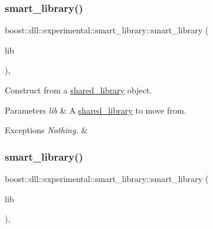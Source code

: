 \subsubsection{\texorpdfstring{smart\+\_\+library()}{smart\_library()}\hspace{0.1cm}{\footnotesize\ttfamily [7/8]}}
{\footnotesize\ttfamily boost\+::dll\+::experimental\+::smart\+\_\+library\+::smart\+\_\+library (\begin{DoxyParamCaption}\item[{const \hyperlink{a01708}{shared\+\_\+library} \&}]{lib }\end{DoxyParamCaption})\hspace{0.3cm}{\ttfamily [inline]}, {\ttfamily [explicit]}}

Construct from a \hyperlink{a01708}{shared\+\_\+library} object.


\begin{DoxyParams}{Parameters}
{\em lib} & A \hyperlink{a01708}{shared\+\_\+library} to move from.\\
\hline
\end{DoxyParams}

\begin{DoxyExceptions}{Exceptions}
{\em Nothing.} & \\
\hline
\end{DoxyExceptions}
\mbox{\label{a01712_a87ba6326545541fe3c016488ec168e82}} 
\subsubsection{\texorpdfstring{smart\+\_\+library()}{smart\_library()}\hspace{0.1cm}{\footnotesize\ttfamily [8/8]}}
{\footnotesize\ttfamily boost\+::dll\+::experimental\+::smart\+\_\+library\+::smart\+\_\+library (\begin{DoxyParamCaption}\item[{B\+O\+O\+S\+T\+\_\+\+R\+V\+\_\+\+R\+EF(\hyperlink{a01708}{shared\+\_\+library})}]{lib }\end{DoxyParamCaption})\hspace{0.3cm}{\ttfamily [inline]}, {\ttfamily [explicit]}}

